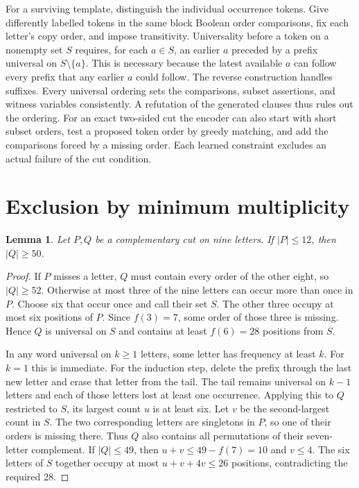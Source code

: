 \documentclass[11pt]{article}
\newtheorem{lemma}[theorem]{Lemma}
\begin{document}
For a surviving template, distinguish the individual occurrence tokens. Give differently labelled tokens in the same block Boolean order comparisons, fix each letter's copy order, and impose transitivity. Universality before a token on a nonempty set $S$ requires, for each $a\in S$, an earlier $a$ preceded by a prefix universal on $S\setminus\{a\}$. This is necessary because the latest available $a$ can follow every prefix that any earlier $a$ could follow. The reverse construction handles suffixes. Every universal ordering sets the comparisons, subset assertions, and witness variables consistently. A refutation of the generated clauses thus rules out the ordering. For an exact two-sided cut the encoder can also start with short subset orders, test a proposed token order by greedy matching, and add the comparisons forced by a missing order. Each learned constraint excludes an actual failure of the cut condition.

\section{Exclusion by minimum multiplicity}
\begin{lemma}\label{lem:short}
Let $P,Q$ be a complementary cut on nine letters. If $|P|\le12$, then $|Q|\ge50$.
\end{lemma}
\begin{proof}
If $P$ misses a letter, $Q$ must contain every order of the other eight, so $|Q|\ge52$. Otherwise at most three of the nine letters can occur more than once in $P$. Choose six that occur once and call their set $S$. The other three occupy at most six positions of $P$. Since $f(3)=7$, some order of those three is missing. Hence $Q$ is universal on $S$ and contains at least $f(6)=28$ positions from $S$.

In any word universal on $k\ge1$ letters, some letter has frequency at least $k$. For $k=1$ this is immediate. For the induction step, delete the prefix through the last new letter and erase that letter from the tail. The tail remains universal on $k-1$ letters and each of those letters lost at least one occurrence. Applying this to $Q$ restricted to $S$, its largest count $u$ is at least six. Let $v$ be the second-largest count in $S$. The two corresponding letters are singletons in $P$, so one of their orders is missing there. Thus $Q$ also contains all permutations of their seven-letter complement. If $|Q|\le49$, then $u+v\le49-f(7)=10$ and $v\le4$. The six letters of $S$ together occupy at most $u+v+4v\le26$ positions, contradicting the required 28.
\end{proof}
\end{document}
